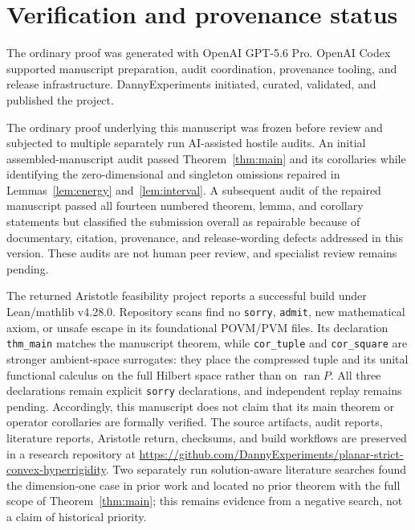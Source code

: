 \documentclass[11pt,a4paper]{amsart}
\theoremstyle{remark}
\newcommand{\ran}{\operatorname{ran}}
\begin{document}
\section*{Verification and provenance status}

The ordinary proof was generated with OpenAI GPT-5.6 Pro.  OpenAI Codex
supported manuscript preparation, audit coordination, provenance tooling,
and release infrastructure.  DannyExperiments initiated, curated, validated,
and published the project.

The ordinary proof underlying this manuscript was frozen before review and
subjected to multiple separately run AI-assisted hostile audits.  An initial
assembled-manuscript audit passed Theorem~\ref{thm:main} and its corollaries
while identifying the zero-dimensional and singleton omissions repaired in
Lemmas~\ref{lem:energy} and~\ref{lem:interval}.  A subsequent audit of the
repaired manuscript passed all fourteen numbered theorem, lemma, and
corollary statements but classified the submission overall as repairable
because of documentary, citation, provenance, and release-wording defects
addressed in this version.  These audits are not human peer review, and
specialist review remains pending.

The returned Aristotle feasibility project reports a successful build under
Lean/mathlib v4.28.0.  Repository scans find no \texttt{sorry},
\texttt{admit}, new mathematical axiom, or unsafe escape in its foundational
POVM/PVM files.  Its declaration \texttt{thm\_main} matches the manuscript
theorem, while \texttt{cor\_tuple} and \texttt{cor\_square} are stronger
ambient-space surrogates: they place the compressed tuple and its unital
functional calculus on the full Hilbert space rather than on
\(\ran P\).  All three declarations remain explicit \texttt{sorry}
declarations, and independent replay remains pending.
Accordingly, this manuscript does not claim that its main theorem or operator
corollaries are formally verified.  The source artifacts, audit reports,
literature reports, Aristotle return, checksums, and build workflows are
preserved in a
research repository at
\url{https://github.com/DannyExperiments/planar-strict-convex-hyperrigidity}.
Two separately run solution-aware literature searches found the
dimension-one case in prior work and located no prior theorem with the full
scope of Theorem~\ref{thm:main}; this remains evidence from a negative
search, not a claim of historical priority.
\end{document}
